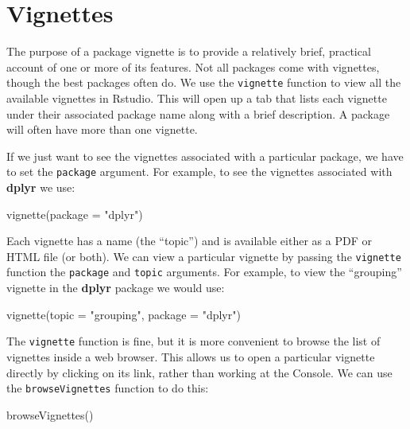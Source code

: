 \documentclass[
]{book}
\newenvironment{Shaded}{\begin{snugshade}}{\end{snugshade}}
\newcommand{\AttributeTok}[1]{\textcolor[rgb]{0.77,0.63,0.00}{#1}}
\newcommand{\FunctionTok}[1]{\textcolor[rgb]{0.00,0.00,0.00}{#1}}
\newcommand{\NormalTok}[1]{#1}
\newcommand{\StringTok}[1]{\textcolor[rgb]{0.31,0.60,0.02}{#1}}
\begin{document}
\hypertarget{vignettes}{%
\section{Vignettes}\label{vignettes}}

The purpose of a package vignette is to provide a relatively brief, practical account of one or more of its features. Not all packages come with vignettes, though the best packages often do. We use the \texttt{vignette} function to view all the available vignettes in Rstudio. This will open up a tab that lists each vignette under their associated package name along with a brief description. A package will often have more than one vignette.

If we just want to see the vignettes associated with a particular package, we have to set the \texttt{package} argument. For example, to see the vignettes associated with \textbf{dplyr} we use:

\begin{Shaded}
\begin{Highlighting}[]
\FunctionTok{vignette}\NormalTok{(}\AttributeTok{package =} \StringTok{"dplyr"}\NormalTok{)}
\end{Highlighting}
\end{Shaded}

Each vignette has a name (the ``topic'') and is available either as a PDF or HTML file (or both). We can view a particular vignette by passing the \texttt{vignette} function the \texttt{package} and \texttt{topic} arguments. For example, to view the ``grouping'' vignette in the \textbf{dplyr} package we would use:

\begin{Shaded}
\begin{Highlighting}[]
\FunctionTok{vignette}\NormalTok{(}\AttributeTok{topic =} \StringTok{"grouping"}\NormalTok{, }\AttributeTok{package =} \StringTok{"dplyr"}\NormalTok{)}
\end{Highlighting}
\end{Shaded}

The \texttt{vignette} function is fine, but it is more convenient to browse the list of vignettes inside a web browser. This allows us to open a particular vignette directly by clicking on its link, rather than working at the Console. We can use the \texttt{browseVignettes} function to do this:

\begin{Shaded}
\begin{Highlighting}[]
\FunctionTok{browseVignettes}\NormalTok{()}
\end{Highlighting}
\end{Shaded}
\end{document}
